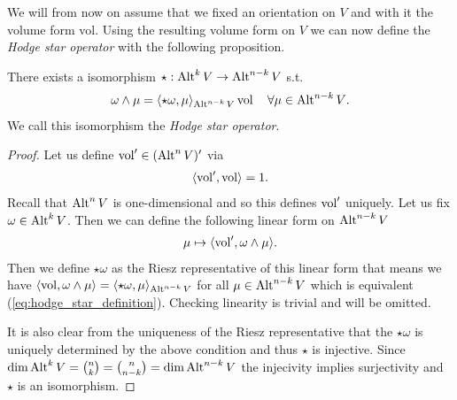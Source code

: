 \documentclass[../master_thesis.tex]{subfiles}
\begin{document}
We will from now on assume that we fixed an orientation on $V$ and with it 
the volume form vol. 
Using the resulting volume form on $V$
we can now define the \textit{Hodge star operator} with the following 
proposition.
\begin{proposition}
    There exists a isomorphism $\star: {\text{Alt}^{k}\,V} 
    \rightarrow {\text{Alt}^{n-k}\,V}$ s.t. 
    \begin{align}
        \omega \wedge \mu = \langle \star \omega, \mu \rangle_{{\text{Alt}^{n-k}\,V}}
        \operatorname{vol} \quad \forall \mu \in {\text{Alt}^{n-k}\,V}.
        \label{eq:hodge_star_definition}            
    \end{align}
    We call this isomorphism the \textit{Hodge star operator}.
\end{proposition}
\begin{proof}

    Let us define $\operatorname{vol}' \in ({\text{Alt}^{n}\,V})'$ via 
    \begin{align*}
        \langle \operatorname{vol}', \operatorname{vol} \rangle = 1.
    \end{align*}
    Recall that ${\text{Alt}^{n}\,V}$ is one-dimensional and so this defines $\operatorname{vol}'$ 
    uniquely. Let us fix $\omega \in {\text{Alt}^{k}\,V}$. 
    Then we can define the following linear form on $
    {\text{Alt}^{n-k}\,V}$
    \begin{align*}
        \mu \mapsto \langle \operatorname{vol}' ,\omega \wedge \mu \rangle.
    \end{align*}
    Then we define
    $\star \omega$ as the Riesz representative of this linear form that means we 
    have $\langle \operatorname{vol}, \omega \wedge \mu \rangle = 
    \langle \star \omega, \mu \rangle_{{\text{Alt}^{n-k}\,V}}$ for all 
    $\mu \in {\text{Alt}^{n-k}\,V}$ which is equivalent (\ref{eq:hodge_star_definition}).
    Checking linearity is trivial and will be omitted.

    It is also clear from the uniqueness of the Riesz representative that 
    the $\star\omega$ is uniquely determined by the above condition and 
    thus $\star$ is injective. Since $\dim {\text{Alt}^{k}\,V} = 
    \binom{n}{k} = \binom{n}{n-k} = \dim {\text{Alt}^{n-k}\,V}$ the injecivity 
    implies surjectivity and $\star$ is an isomorphism.
\end{proof}
\end{document}

